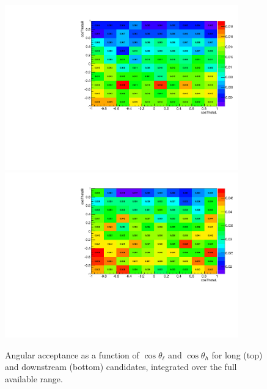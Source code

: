 \begin{figure}[h!]
\includegraphics[width=0.9\textwidth]{Lmumu/figs/efficiencies/2D/2Deff_upper_cosThetaB_vs_cosThetaL_DD.pdf}
\includegraphics[width=0.9\textwidth]{Lmumu/figs/efficiencies/2D/2Deff_upper_cosThetaB_vs_cosThetaL_LL.pdf}
\caption{Angular acceptance as a function of $\cos\theta_\ell$ and $\cos\theta_h$ for long (top) and
downstream (bottom) candidates, integrated over the full available \qsq range.}
\label{fig:2DcosThetaLandBeff}
\end{figure}

